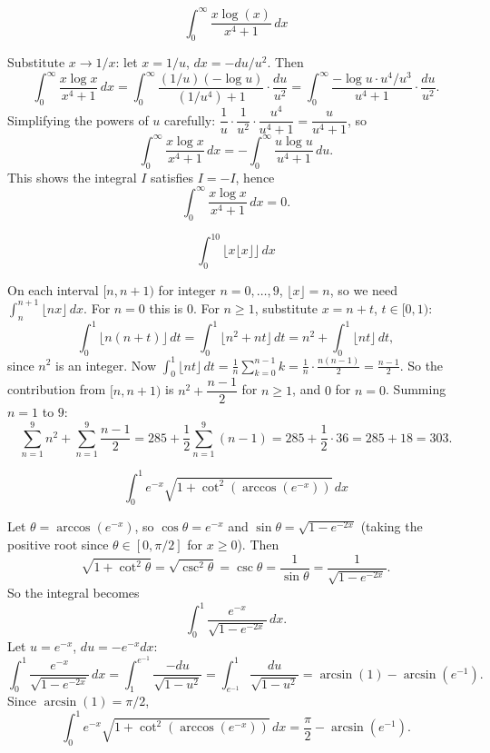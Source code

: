 \begin{questions}
\question
\[ \int_0^{\infty} \frac{x\log(x)}{x^4+1}\,dx \]
\begin{solution}
Substitute $x\to 1/x$: let $x=1/u$, $dx=-du/u^2$. Then
\[ \int_0^\infty \frac{x\log x}{x^4+1}\,dx = \int_0^\infty \frac{(1/u)(-\log u)}{(1/u^4)+1}\cdot\frac{du}{u^2} = \int_0^\infty \frac{-\log u\cdot u^{4}/u^3}{u^4+1}\cdot\frac{du}{u^{2}}. \]
Simplifying the powers of $u$ carefully: $\dfrac{1}{u}\cdot\dfrac{1}{u^2}\cdot\dfrac{u^4}{u^4+1} = \dfrac{u}{u^4+1}$, so
\[ \int_0^\infty \frac{x\log x}{x^4+1}\,dx = -\int_0^\infty \frac{u\log u}{u^4+1}\,du. \]
This shows the integral $I$ satisfies $I = -I$, hence
\[ \int_0^\infty \frac{x\log x}{x^4+1}\,dx = 0. \]
\end{solution}

\question
\[ \int_0^{10} \lfloor x\lfloor x\rfloor\rfloor\,dx \]
\begin{solution}
On each interval $[n,n+1)$ for integer $n=0,\dots,9$, $\lfloor x\rfloor = n$, so we need $\displaystyle\int_n^{n+1}\lfloor nx\rfloor\,dx$. For $n=0$ this is $0$. For $n\ge1$, substitute $x=n+t$, $t\in[0,1)$:
\[ \int_0^1 \lfloor n(n+t)\rfloor\,dt = \int_0^1 \lfloor n^2+nt\rfloor\,dt = n^2 + \int_0^1 \lfloor nt\rfloor\,dt, \]
since $n^2$ is an integer. Now $\displaystyle\int_0^1\lfloor nt\rfloor\,dt = \frac{1}{n}\sum_{k=0}^{n-1}k = \frac{1}{n}\cdot\frac{n(n-1)}{2} = \frac{n-1}{2}$.
So the contribution from $[n,n+1)$ is $n^2 + \dfrac{n-1}{2}$ for $n\ge1$, and $0$ for $n=0$. Summing $n=1$ to $9$:
\[ \sum_{n=1}^9 n^2 + \sum_{n=1}^9\frac{n-1}{2} = 285 + \frac{1}{2}\sum_{n=1}^9(n-1) = 285 + \frac{1}{2}\cdot36 = 285+18 = 303. \]
\end{solution}

\question
\[ \int_0^1 e^{-x}\sqrt{1+\cot^2(\arccos(e^{-x}))}\,dx \]
\begin{solution}
Let $\theta = \arccos(e^{-x})$, so $\cos\theta = e^{-x}$ and $\sin\theta = \sqrt{1-e^{-2x}}$ (taking the positive root since $\theta\in[0,\pi/2]$ for $x\ge0$). Then
\[ \sqrt{1+\cot^2\theta} = \sqrt{\csc^2\theta} = \csc\theta = \frac{1}{\sin\theta} = \frac{1}{\sqrt{1-e^{-2x}}}. \]
So the integral becomes
\[ \int_0^1 \frac{e^{-x}}{\sqrt{1-e^{-2x}}}\,dx. \]
Let $u=e^{-x}$, $du=-e^{-x}dx$:
\[ \int_0^1 \frac{e^{-x}}{\sqrt{1-e^{-2x}}}\,dx = \int_{1}^{e^{-1}} \frac{-du}{\sqrt{1-u^2}} = \int_{e^{-1}}^1 \frac{du}{\sqrt{1-u^2}} = \arcsin(1) - \arcsin(e^{-1}). \]
Since $\arcsin(1)=\pi/2$,
\[ \int_0^1 e^{-x}\sqrt{1+\cot^2(\arccos(e^{-x}))}\,dx = \frac{\pi}{2} - \arcsin(e^{-1}). \]
\end{solution}


\end{questions}
